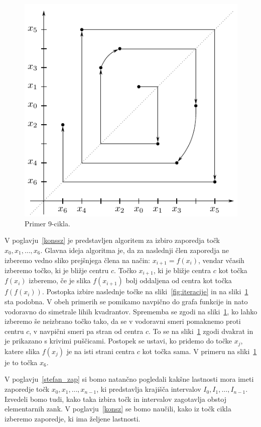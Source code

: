 \documentclass[mat2]{fmfdelo}
\begin{document}
\begin{primer}[9-cikel]
\begin{figure}[h]
  \centering
  \includegraphics{images/spiral.pdf}
  \caption[Primer vektorske slike.]{Primer 9-cikla.}
  \label{fig:spiral}
\end{figure}

V poglavju~\ref{konssz} je predstavljen algoritem za izbiro zaporedja točk $x_0, x_1, \dots, x_6$. Glavna ideja algoritma je, da za naslednji člen zaporedja ne izberemo vedno sliko prejšnjega člena na način: $x_{i+1} = f(x_i)$, vendar včasih izberemo točko, ki je bližje centru $c$. Točko $x_{i+1}$, ki je bližje centra $c$ kot točka $f(x_i)$ izberemo, če je slika $f(x_{i+1})$ bolj oddaljena od centra kot točka $f(f(x_i))$. Postopka izbire naslednje točke na sliki~\ref{fig:iteracije} in na sliki~\ref{fig:spiral} sta podobna. V obeh primerih se pomikamo navpično do grafa funkcije in nato vodoravno do simetrale lihih kvadrantov. Sprememba se zgodi na sliki~\ref{fig:spiral}, ko lahko izberemo še neizbrano točko tako, da se v vodoravni smeri pomaknemo proti centru $c$, v navpični smeri pa stran od centra $c$. To se na sliki~\ref{fig:spiral} zgodi dvakrat in je prikazano s krivimi puščicami. 
Postopek se ustavi, ko pridemo do točke $x_j$, katere slika $f(x_j)$ je na isti strani centra $c$ kot točka sama. V primeru na sliki~\ref{fig:spiral} je to točka $x_6$.

V poglavju~\ref{stefan_zap} si bomo natančno pogledali kakšne lastnosti mora imeti zaporedje točk $x_0, x_1, \dots, x_{n-1}$, ki predstavlja krajišča intervalov $I_0, I_1, \dots, I_{n-1}$. Izvedeli bomo tudi, kako taka izbira točk in intervalov zagotavlja obstoj elementarnih zank. V poglavju~\ref{konsz} se bomo naučili, kako iz točk cikla izberemo zaporedje, ki ima željene lastnosti. 

\end{primer}
\end{document}
